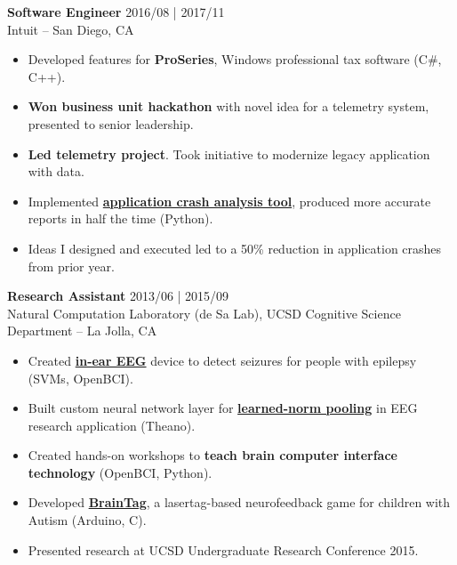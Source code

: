 \documentclass[line,mm]{res}
\begin{document}
{\bf Software Engineer} \hfill 2016/08 | 2017/11 \\
  Intuit -- San Diego, CA
  \begin{itemize}  \itemsep -2pt %
    \item Developed features for {\bf ProSeries}, Windows professional tax software (C\#, C++).
    \item {\bf Won business unit hackathon} with novel idea for a telemetry system, presented to senior leadership.
    \item {\bf Led telemetry project}. Took initiative to modernize legacy application with data.
    \item Implemented \href{https://github.com/alxrsngrtn/CrashAnalysisTool}{{\bf application crash analysis tool}}, produced more accurate reports in half the time (Python).
    \item Ideas I designed and executed led to a 50\% reduction in application crashes from prior year. 
  \end{itemize} 

	
{\bf Research Assistant} \hfill            2013/06 | 2015/09 \\
   Natural Computation Laboratory (de Sa Lab), UCSD Cognitive Science Department -- La Jolla, CA
   \begin{itemize}  \itemsep -2pt %
     \item Created \href{https://youtu.be/UMACp0fc9TA}{{\bf in-ear EEG}} device to detect seizures for people with epilepsy (SVMs, OpenBCI).
     \item Built custom neural network layer for \href{https://github.com/alxrsngrtn/LearnedNormPooling}{{\bf learned-norm pooling}} in EEG research application (Theano).
     \item Created hands-on workshops to {\bf teach brain computer interface technology} (OpenBCI, Python).
     \item Developed \href{https://github.com/alxrsngrtn/BrainTag}{{\bf BrainTag}}, a lasertag-based neurofeedback game for children with Autism (Arduino, C). 
     \item Presented research at UCSD Undergraduate Research Conference 2015.
   \end{itemize} 
	
    
\end{document}

